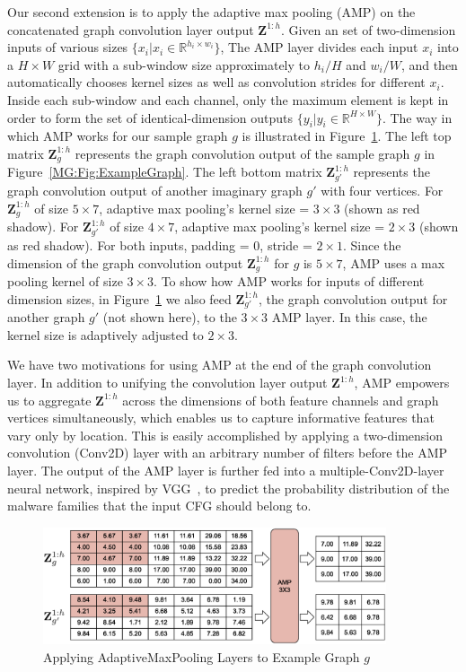 Our second extension is to apply the adaptive max pooling (AMP) on the concatenated graph convolution layer output $\mathbf{Z}^{1:h}$.
Given an set of two-dimension inputs of various sizes $\{x_i | x_i \in \mathbb{R}^{h_i \times w_i}\}$,
The AMP layer divides each input $x_i$ into a $H \times W$ grid with a sub-window size approximately to $h_i / H$ and $w_i / W$,
and then automatically chooses kernel sizes as well as convolution strides for different $x_i$.
Inside each sub-window and each channel, only the maximum element is kept in order to form the set of identical-dimension outputs $\{y_i | y_i \in \mathbb{R}^{ H \times W}\}$.
The way in which AMP works for our sample graph $g$ is illustrated in Figure~\ref{MG:Fig:ExampleAmp}.
The left top matrix $\mathbf{Z}^{1:h}_g$ represents the graph convolution output of the sample graph $g$ in Figure~\ref{MG:Fig:ExampleGraph}.
The left bottom matrix $\mathbf{Z}^{1:h}_{g'}$ represents the graph convolution output of another imaginary graph $g'$ with four vertices.
For $\mathbf{Z}^{1:h}_g$ of size $5\times 7$, adaptive max pooling's kernel size = $3 \times 3$ (shown as red shadow).
For $\mathbf{Z}^{1:h}_{g'}$ of size $4\times 7$, adaptive max pooling's kernel size = $2 \times 3$ (shown as red shadow).
For both inputs, padding = 0, stride = $2 \times 1$.
Since the dimension of the graph convolution output $\mathbf{Z}^{1:h}_g$ for $g$ is $5 \times 7$, AMP uses a max pooling kernel of size $3 \times 3$.
To show how AMP works for inputs of different dimension sizes, in Figure~\ref{MG:Fig:ExampleAmp} we also feed $\mathbf{Z}^{1:h}_{g'}$,
the graph convolution output for another graph $g'$ (not shown here), to the $3 \times 3$ AMP layer.
In this case, the kernel size is adaptively adjusted to $2 \times 3$.

We have two motivations for using AMP at the end of the graph convolution layer.
In addition to unifying the convolution layer output $\mathbf{Z}^{1:h}$, AMP empowers us to aggregate $\mathbf{Z}^{1:h}$
across the dimensions of both feature channels and graph vertices simultaneously,
which enables us to capture informative features that vary only by location.
This is easily accomplished by applying a two-dimension convolution (Conv2D) layer with an arbitrary number of filters before the AMP layer.
The output of the AMP layer is further fed into a multiple-Conv2D-layer neural network, inspired by VGG~\cite{VGG}, to predict the probability distribution of the malware families that the input CFG should belong to.

\begin{figure}[htbp]
    \centerline{\includegraphics[width=0.90\textwidth]{Magic/figures/ExampleAmp.eps}}
    \caption{Applying AdaptiveMaxPooling Layers to Example Graph $g$}
    \label{MG:Fig:ExampleAmp}
\end{figure}
